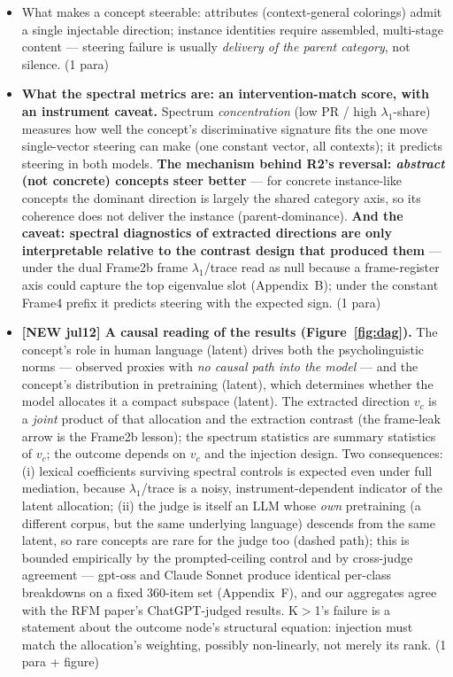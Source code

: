 \documentclass[11pt]{article}
\newenvironment{outline}{\color{gray!70!black}\begin{itemize}[leftmargin=1.2em,itemsep=1pt]}{\end{itemize}\color{black}}
\begin{document}
\begin{outline}
\item What makes a concept steerable: attributes (context-general colorings) admit a single injectable direction; instance identities require assembled, multi-stage content --- steering failure is usually \emph{delivery of the parent category}, not silence. (1 para)
\item \textbf{What the spectral metrics are: an intervention-match score, with an instrument caveat.} Spectrum \emph{concentration} (low PR / high $\lambda_1$-share) measures how well the concept's discriminative signature fits the one move single-vector steering can make (one constant vector, all contexts); it predicts steering in both models. \textbf{The mechanism behind R2's reversal: \emph{abstract} (not concrete) concepts steer better} --- for concrete instance-like concepts the dominant direction is largely the shared category axis, so its coherence does not deliver the instance (parent-dominance). \textbf{And the caveat: spectral diagnostics of extracted directions are only interpretable relative to the contrast design that produced them} --- under the dual Frame2b frame $\lambda_1$/trace read as null because a frame-register axis could capture the top eigenvalue slot (Appendix~B); under the constant Frame4 prefix it predicts steering with the expected sign. (1 para)
\item \textbf{[NEW jul12] A causal reading of the results (Figure~\ref{fig:dag}).} The concept's role in human language (latent) drives both the psycholinguistic norms --- observed proxies with \emph{no causal path into the model} --- and the concept's distribution in pretraining (latent), which determines whether the model allocates it a compact subspace (latent). The extracted direction $v_c$ is a \emph{joint} product of that allocation and the extraction contrast (the frame-leak arrow is the Frame2b lesson); the spectrum statistics are summary statistics of $v_c$; the outcome depends on $v_c$ and the injection design. Two consequences: (i) lexical coefficients surviving spectral controls is expected even under full mediation, because $\lambda_1$/trace is a noisy, instrument-dependent indicator of the latent allocation; (ii) the judge is itself an LLM whose \emph{own} pretraining (a different corpus, but the same underlying language) descends from the same latent, so rare concepts are rare for the judge too (dashed path); this is bounded empirically by the prompted-ceiling control and by cross-judge agreement --- gpt-oss and Claude Sonnet produce identical per-class breakdowns on a fixed 360-item set (Appendix~F), and our aggregates agree with the RFM paper's ChatGPT-judged results. K$>$1's failure is a statement about the outcome node's structural equation: injection must match the allocation's weighting, possibly non-linearly, not merely its rank. (1 para + figure)

\end{outline}
\end{document}
